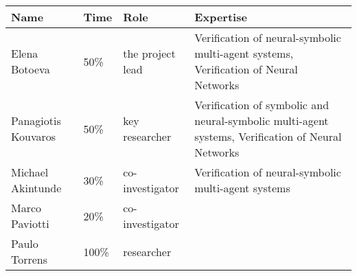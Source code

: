 \documentclass{article}
\begin{document}
\begin{tabular}{lllp{8cm}}
  Name & Time & Role & Expertise\\
  \toprule
  Elena Botoeva & 50\% & the project lead & Verification of neural-symbolic multi-agent systems, Verification of Neural Networks\\
  Panagiotis Kouvaros & 50\% & key researcher & Verification of symbolic and neural-symbolic multi-agent systems, Verification of Neural Networks\\
  Michael Akintunde & 30\% & co-investigator & Verification of neural-symbolic multi-agent systems\\
  Marco Paviotti & 20\% & co-investigator & \\
  Paulo Torrens & 100\% & researcher &
\end{tabular}
\end{document}
